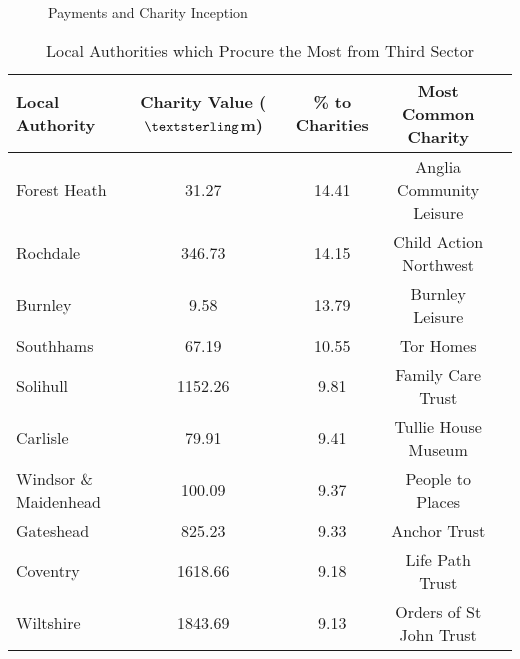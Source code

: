 \documentclass[12pt]{article}
\begin{document}
\begin{figure}[!t]
\centering
\caption{Payments and Charity Inception}\label{valuesinceinception}
	\datatablez
	\makeatletter
\end{figure}

\begin{table}[!b]
\centering
\caption{Local Authorities which Procure the Most from Third Sector}
\label{highestvalueLA}
\begin{tabular}{lcccc}
\toprule
Local Authority	&	Charity Value ($\textsterling$m)	&	\% to Charities	&	Most Common Charity\\  \midrule
Forest Heath	&	31.27	&	14.41	&	Anglia Community Leisure\\
Rochdale	&	346.73	&	14.15	&	Child Action Northwest\\
Burnley	&	9.58	&	13.79	&	Burnley Leisure\\
Southhams	&	67.19	&	10.55	&	Tor Homes\\
Solihull	&	1152.26	&	9.81	&	Family Care Trust\\
Carlisle	&	79.91	&	9.41	&	Tullie House Museum\\
Windsor \& Maidenhead	&	100.09	&	9.37	&	People to Places\\
Gateshead	&	825.23	&	9.33	&	Anchor Trust\\
Coventry	&	1618.66	&	9.18	&	Life Path Trust\\
Wiltshire	&	1843.69	&	9.13	&	Orders of St John Trust\\ \bottomrule
\end{tabular}
\end{table}
\end{document}
